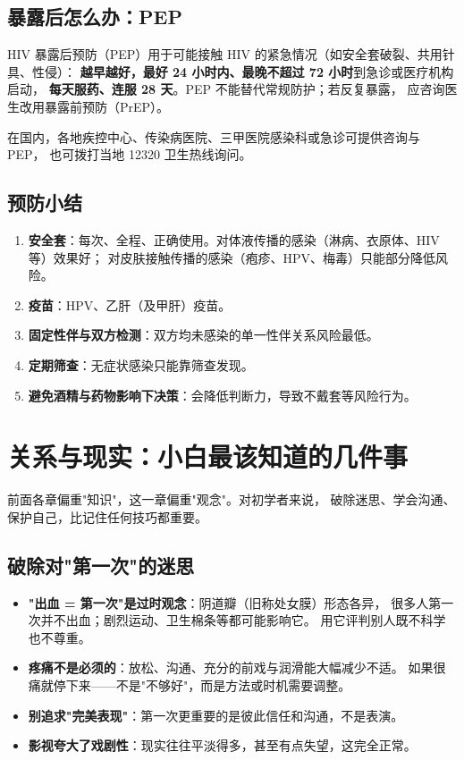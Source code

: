 \documentclass[12pt,UTF8,openany]{ctexbook}
\begin{document}
\section{暴露后怎么办：PEP}

HIV 暴露后预防（PEP）用于可能接触 HIV 的紧急情况（如安全套破裂、共用针具、性侵）：
\textbf{越早越好，最好 24 小时内、最晚不超过 72 小时}到急诊或医疗机构启动，
\textbf{每天服药、连服 28 天}。PEP 不能替代常规防护；若反复暴露，
应咨询医生改用暴露前预防（PrEP）。

在国内，各地疾控中心、传染病医院、三甲医院感染科或急诊可提供咨询与 PEP，
也可拨打当地 12320 卫生热线询问。

\section{预防小结}

\begin{enumerate}[leftmargin=2em,itemsep=0.3em]
  \item \textbf{安全套}：每次、全程、正确使用。对体液传播的感染（淋病、衣原体、HIV 等）效果好；
        对皮肤接触传播的感染（疱疹、HPV、梅毒）只能部分降低风险。
  \item \textbf{疫苗}：HPV、乙肝（及甲肝）疫苗。
  \item \textbf{固定性伴与双方检测}：双方均未感染的单一性伴关系风险最低。
  \item \textbf{定期筛查}：无症状感染只能靠筛查发现。
  \item \textbf{避免酒精与药物影响下决策}：会降低判断力，导致不戴套等风险行为。
\end{enumerate}

\chapter{关系与现实：小白最该知道的几件事}
\label{chap:reality}

前面各章偏重"知识"，这一章偏重"观念"。对初学者来说，
破除迷思、学会沟通、保护自己，比记住任何技巧都重要。

\section{破除对"第一次"的迷思}

\begin{itemize}[leftmargin=2em]
  \item \textbf{"出血 = 第一次"是过时观念}：阴道瓣（旧称处女膜）形态各异，
        很多人第一次并不出血；剧烈运动、卫生棉条等都可能影响它。
        用它评判别人既不科学也不尊重。
  \item \textbf{疼痛不是必须的}：放松、沟通、充分的前戏与润滑能大幅减少不适。
        如果很痛就停下来——不是"不够好"，而是方法或时机需要调整。
  \item \textbf{别追求"完美表现"}：第一次更重要的是彼此信任和沟通，不是表演。
  \item \textbf{影视夸大了戏剧性}：现实往往平淡得多，甚至有点失望，这完全正常。
\end{itemize}
\end{document}
